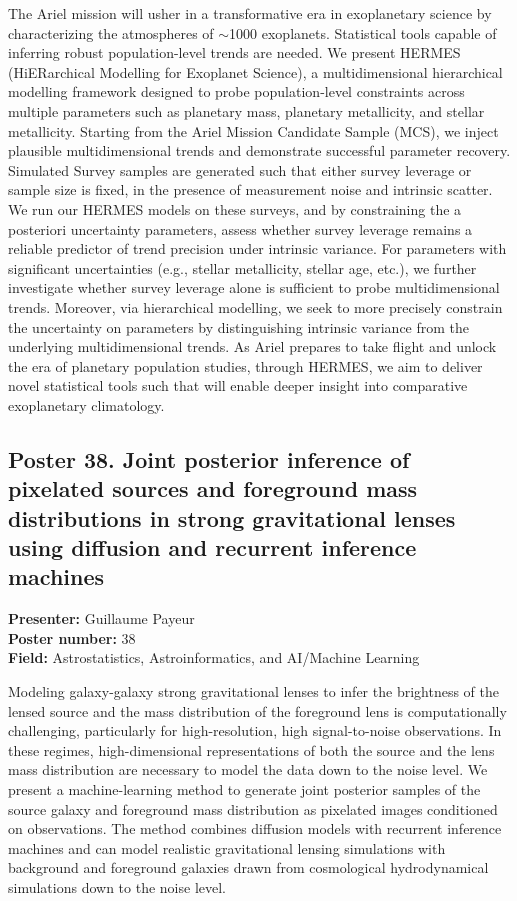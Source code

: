 The Ariel mission will usher in a transformative era in exoplanetary science by characterizing the atmospheres of $\sim$1000 exoplanets. Statistical tools capable of inferring robust population-level trends are needed. We present HERMES (HiERarchical Modelling for Exoplanet Science), a multidimensional hierarchical modelling framework designed to probe population-level constraints across multiple parameters such as planetary mass, planetary metallicity, and stellar metallicity. Starting from the Ariel Mission Candidate Sample (MCS), we inject plausible multidimensional trends and demonstrate successful parameter recovery. Simulated Survey samples are generated such that either survey leverage or sample size is fixed, in the presence of measurement noise and intrinsic scatter. We run our HERMES models on these surveys, and by constraining the a posteriori uncertainty parameters, assess whether survey leverage remains a reliable predictor of trend precision under intrinsic variance. For parameters with significant uncertainties (e.g., stellar metallicity, stellar age, etc.), we further investigate whether survey leverage alone is sufficient to probe multidimensional trends. Moreover, via hierarchical modelling, we seek to more precisely constrain the uncertainty on parameters by distinguishing intrinsic variance from the underlying multidimensional trends. As Ariel prepares to take flight and unlock the era of planetary population studies, through HERMES, we aim to deliver novel statistical tools such that will enable deeper insight into comparative exoplanetary climatology.

\hypertarget{poster-abstract-talk-256}{}\label{poster-abstract-page-talk-256}
\subsection*{Poster 38. Joint posterior inference of pixelated sources and foreground mass distributions in strong gravitational lenses using diffusion and recurrent inference machines}
\textbf{Presenter:} Guillaume Payeur\\
\textbf{Poster number:} 38\\
\textbf{Field:} Astrostatistics, Astroinformatics, and AI/Machine Learning

Modeling galaxy-galaxy strong gravitational lenses to infer the brightness of the lensed source and the mass distribution of the foreground lens is computationally challenging, particularly for high-resolution, high signal-to-noise observations. In these regimes, high-dimensional representations of both the source and the lens mass distribution are necessary to model the data down to the noise level. We present a machine-learning method to generate joint posterior samples of the source galaxy and foreground mass distribution as pixelated images conditioned on observations. The method combines diffusion models with recurrent inference machines and can model realistic gravitational lensing simulations with background and foreground galaxies drawn from cosmological hydrodynamical simulations down to the noise level.

